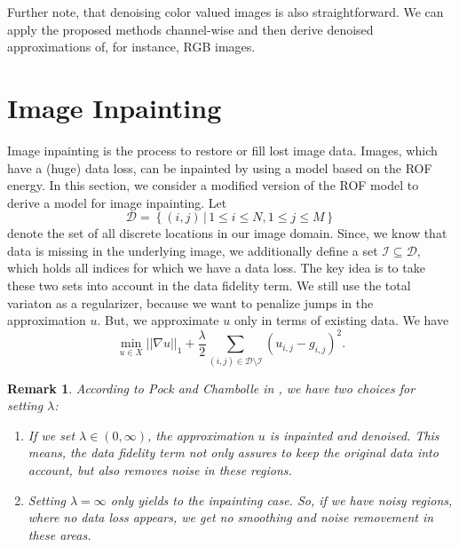 \documentclass{scrreprt}
\newtheorem{remark}[theorem]{Remark}
\begin{document}
        Further note, that denoising color valued images is also straightforward. We can apply the proposed methods channel-wise and then derive denoised approximations of, for instance, RGB images.


    \section{Image Inpainting} %
    \label{sec:image_inpainting}

        Image inpainting is the process to restore or fill lost image data. Images, which have a (huge) data loss, can be inpainted by using a model based on the ROF energy. In this section, we consider a modified version of the ROF model to derive a model for image inpainting. Let
            $$
                \mathcal{D} = \left\{ (i, j) \, | \, 1 \le i \le N, 1 \le j \le M \right\}
            $$
        denote the set of all discrete locations in our image domain. Since, we know that data is missing in the underlying image, we additionally define a set $\mathcal{I} \subseteq \mathcal{D}$, which holds all indices for which we have a data loss. The key idea is to take these two sets into account in the data fidelity term. We still use the total variaton as a regularizer, because we want to penalize jumps in the approximation $u$. But, we approximate $u$ only in terms of existing data. We have
            \begin{equation}
                \min_{u \in X} ||\nabla u||_{1} + \frac{\lambda}{2} \sum_{(i,j) \in \mathcal{D} \setminus \mathcal{I}} (u_{i,j} - g_{i,j})^{2}.
                \label{eq:inpainting_model}
            \end{equation}

        \begin{remark}
            According to Pock and Chambolle in \cite{Chambolle10afirst-order}, we have two choices for setting $\lambda$:
                \begin{enumerate}
                    \item If we set $\lambda \in (0, \infty)$, the approximation $u$ is inpainted and denoised. This means, the data fidelity term not only assures to keep the original data into account, but also removes noise in these regions.
                    \item Setting $\lambda = \infty$ only yields to the inpainting case. So, if we have noisy regions, where no data loss appears, we get no smoothing and noise removement in these areas.
                \end{enumerate}
        \end{remark}
\end{document}
